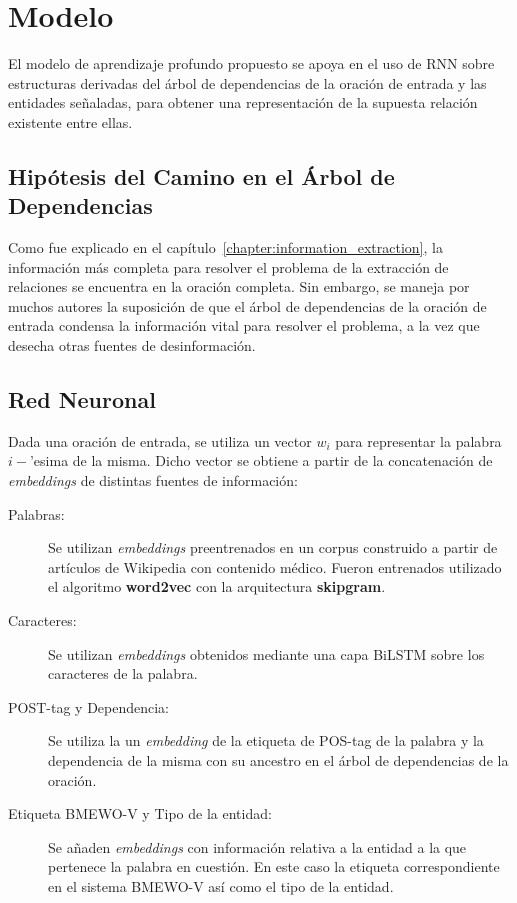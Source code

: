 \section{Modelo}\label{sec:model}

El modelo de aprendizaje profundo propuesto se apoya en el uso de RNN sobre estructuras derivadas del árbol de dependencias de la oración de entrada y las entidades señaladas, para obtener una representación de la supuesta relación existente entre ellas.

\subsection{Hipótesis del Camino en el Árbol de Dependencias}

Como fue explicado en el capítulo~\ref{chapter:information_extraction}, la información más completa para resolver el problema de la extracción de relaciones se encuentra en la oración completa. Sin embargo, se maneja por muchos autores la suposición de que el árbol de dependencias de la oración de entrada condensa la información vital para resolver el problema, a la vez que desecha otras fuentes de desinformación.

\subsection{Red Neuronal}

Dada una oración de entrada, se utiliza un vector $w_i$ para representar la palabra $i-$'esima de la misma. Dicho vector se obtiene a partir de la concatenación de \textit{embeddings} de distintas fuentes de información:

\begin{description}
	\item[Palabras:] Se utilizan \textit{embeddings} preentrenados en un corpus construido a partir de artículos de Wikipedia con contenido médico.
	Fueron entrenados utilizado el algoritmo \textbf{word2vec}\cite{word2vec} con la arquitectura \textbf{skipgram}.
	
	\item[Caracteres:] Se utilizan \textit{embeddings} obtenidos mediante una capa BiLSTM sobre los caracteres de la palabra.
	
	\item[POST-tag y Dependencia:] Se utiliza la un \textit{embedding} de la etiqueta de POS-tag de la palabra y la dependencia de la misma con su ancestro en el árbol de dependencias de la oración.
	
	\item[Etiqueta BMEWO-V y Tipo de la entidad:] Se añaden \textit{embeddings} con información relativa a la entidad a la que pertenece la palabra en cuestión.
	En este caso la etiqueta correspondiente en el sistema BMEWO-V así como el tipo de la entidad.
	
\end{description}


